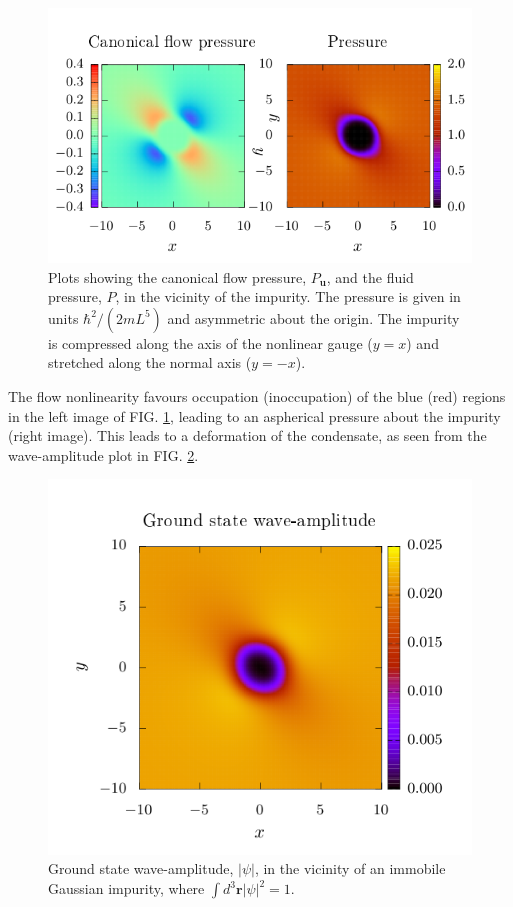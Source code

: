 \documentclass[twocolumn, nofootinbib, nobibnotes, amsmath,amssymb,aps, pra, floatfix]{revtex4-1}
\renewcommand{\v}[1]{\ensuremath{\mathbf{#1}}} %
\newcommand{\abs}[1]{\left| #1 \right|} %
\begin{document}
\begin{figure}[h]
  \centering
  \includegraphics[width=\columnwidth]{./GroundState_a1Pressure.pdf}
  \caption{Plots showing the canonical flow pressure, $P_{\v{u}}$, and the fluid pressure, $P$, in the vicinity of the impurity. The pressure is given in units $\hbar^2/\left( 2mL^5 \right)$ and asymmetric about the origin. The impurity is compressed along the axis of the nonlinear gauge ($y=x$) and stretched along the normal axis ($y=-x$).}
  \label{fig:GroundStatePressures}
\end{figure}
The flow nonlinearity favours occupation (inoccupation) of the blue (red) regions in the left image of FIG. \ref{fig:GroundStatePressures}, leading to an aspherical pressure about the impurity (right image).
This leads to a deformation of the condensate, as seen from the wave-amplitude plot in FIG. \ref{fig:GroundStateWaveAmplitude}.
\begin{figure}
  \centering
  \includegraphics[width=.8\columnwidth]{./GroundState_a1WaveAmplitude.pdf}
  \caption{Ground state wave-amplitude, $\abs{\psi}$, in the vicinity of an immobile Gaussian impurity, where $\int d^3\v{r}\abs{\psi}^2=1$.} 
  \label{fig:GroundStateWaveAmplitude}
\end{figure}
\end{document}
